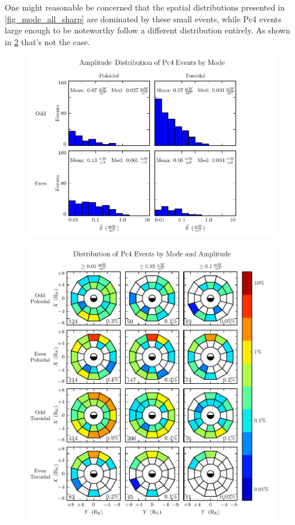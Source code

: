 \todo{$\cdots$}

One might reasonable be concerned that the spatial distributions presented in \cref{fig_mode_all_sharp} are dominated by these small events, while Pc4 events large enough to be noteworthy follow a different distribution entirely. As shown in \cref{fig_mode_amp} that's not the case. 

\todo{$\cdots$}

\begin{figure}[!htb]
    \centering
    \includegraphics[width=\textwidth]{figures/amp.pdf}
    \caption[Amplitude Distribution of Pc4 Events by Mode]{
      \todo{$\cdots$}
    }
    \label{fig_amp}
\end{figure}


\begin{figure}[!htb]
    \centering
    \includegraphics[width=\textwidth]{figures/mode_amp.pdf}
    \caption[Observation Rate of Pc4 Events by Mode and Amplitude]{
      \todo{$\cdots$}
    }
    \label{fig_mode_amp}
\end{figure}


